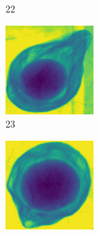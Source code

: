 \documentclass[11pt]{article}
\begin{document}
\begin{figure}[!h]
\begin{subfigure}[b]{0.22\textwidth}
         \caption{22}
         \label{fig:avo_21}
     \end{subfigure}
     \hfill
     \begin{subfigure}[b]{0.22\textwidth}
         \centering
         \includegraphics[width=\textwidth]{figurer/avocado_dataset/avo_22.jpg}
         \caption{23}
         \label{fig:avo_22}
     \end{subfigure}
     \hfill
     \begin{subfigure}[b]{0.22\textwidth}
         \centering
         \includegraphics[width=\textwidth]{figurer/avocado_dataset/avo_23.jpg}

\end{subfigure}
\end{figure}
\end{document}
